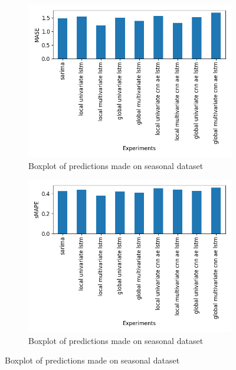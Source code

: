 \begin{figure}
  \begin{subfigure}[b]{0.49\textwidth}
    \includegraphics[width=\textwidth]{./figs/results/barplot/MASE-all-dataset.png}
    \hfill
    \caption{Boxplot of predictions made on seasonal dataset}
  \end{subfigure}
  \begin{subfigure}[b]{0.49\textwidth}
    \includegraphics[width=\textwidth]{./figs/results/barplot/sMAPE-all-dataset.png}
    \hfill
    \caption{Boxplot of predictions made on seasonal dataset}

  \end{subfigure}
\end{figure}

